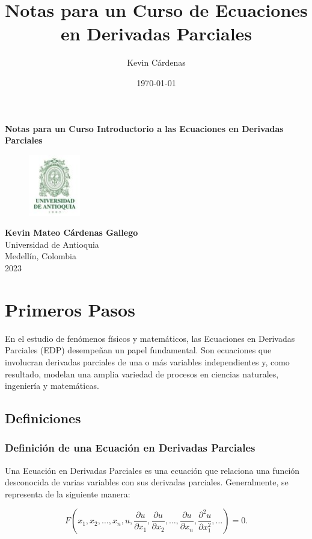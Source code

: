 \documentclass[11pt]{book}
\title{Notas para un Curso de Ecuaciones en Derivadas Parciales}
\author{Kevin Cárdenas}
\date{\today}
\theoremstyle{plain}
\theoremstyle{definition}
\begin{document}
\dominitoc 
\begin{titlepage}
    \centering
    \vspace{1cm}
    \Huge\textbf{Notas para un Curso Introductorio a las Ecuaciones en Derivadas Parciales}
    \vfill
    \begin{figure}[h]
        \centering
        \includegraphics[width=0.2\textwidth]{logoudea.jpg}
    \end{figure}
    \vspace{1cm}
    \Large\textbf{Kevin Mateo Cárdenas Gallego}\\
    \large{Universidad de Antioquia}\\
    \large{Medellín, Colombia}\\
    \large{2023}
\end{titlepage}

\tableofcontents %

\newpage

\chapter{Primeros Pasos}
\minitoc
En el estudio de fenómenos físicos y matemáticos, las Ecuaciones en Derivadas Parciales (EDP) desempeñan un papel fundamental. Son ecuaciones que involucran derivadas parciales de una o más variables independientes y, como resultado, modelan una amplia variedad de procesos en ciencias naturales, ingeniería y matemáticas.

\section{Definiciones}
\subsection*{Definición de una Ecuación en Derivadas Parciales}

Una Ecuación en Derivadas Parciales es una ecuación que relaciona una función desconocida de varias variables con sus derivadas parciales. Generalmente, se representa de la siguiente manera:

\begin{equation}
F(x_1, x_2, \ldots, x_n, u, \frac{\partial u}{\partial x_1}, \frac{\partial u}{\partial x_2}, \ldots, \frac{\partial u}{\partial x_n}, \frac{\partial^2 u}{\partial x_1^2}, \ldots) = 0.
\end{equation}
\end{document}
